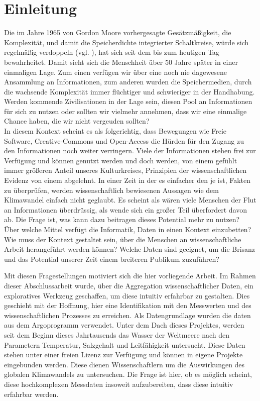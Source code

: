 
\section{Einleitung}

    
    Die im Jahre 1965 von Gordon Moore vorhergesagte Gesätzmäßigkeit, die Komplexität, und damit die Speicherdichte integrierter Schaltkreise, würde sich regelmäßig verdoppeln (vgl. \cite{moore1998cramming}),  hat sich seit dem bis zum heutigen Tag bewahrheitet. Damit sieht sich die Menschheit über 50 Jahre später in einer einmaligen Lage. 
    Zum einen verfügen wir über eine noch nie dagewesene Ansammlung an Informationen, zum anderen wurden die Speichermedien, durch die wachsende Komplexität immer flüchtiger und schwieriger in der Handhabung. Werden kommende Zivilisationen in der Lage sein, diesen Pool an Informationen für sich zu nutzen oder sollten wir vielmehr annehmen, dass wir eine einmalige Chance haben, die wir nicht vergeuden sollten? \\
    
    In diesem Kontext scheint es als folgerichtig, dass Bewegungen wie Freie Software, Creative-Commons und Open-Access die Hürden für den Zugang zu den Informationen noch weiter verringern.  Viele der Informationen stehen frei zur Verfügung und können genutzt werden und doch werden, von einem gefühlt immer größeren Anteil unseres Kulturkreises, Prinzipien der wissenschaftlichen Evidenz von einem abgelehnt. 
    In einer Zeit in der es einfacher den je ist, Fakten zu überprüfen, werden wissenschaftlich bewiesenen Aussagen wie dem Klimawandel einfach nicht geglaubt.
    Es scheint als wären viele Menschen der Flut an Informationen überdrüssig, als wende sich ein großer Teil überfordert davon ab.
    Die Frage ist, was kann dazu beitragen dieses Potential mehr zu nutzen? 
    Über welche Mittel verfügt die Informatik, Daten in einen Kontext einzubetten? Wie muss der Kontext gestaltet sein, über die Menschen an  wissenschaftliche Arbeit herangeführt werden können? Welche Daten sind geeignet, um die Brisanz und das Potential unserer Zeit einem breiteren Publikum zuzuführen? 
    
    Mit diesen Fragestellungen motiviert sich die hier vorliegende Arbeit. Im Rahmen dieser Abschlussarbeit wurde, über die Aggregation wissenschaftlicher Daten, ein exploratives Werkzeug geschaffen, um diese intuitiv erfahrbar zu gestalten. Dies geschieht mit der Hoffnung, hier eine Identifikation mit den Messwerten und des wissenschaftlichen Prozesses zu erreichen. Als Datengrundlage wurden die daten aus dem Argoprogramm verwendet. Unter dem Dach dieses Projektes, werden seit dem Beginn dieses Jahrtausends das Wasser der Weltmeere nach den Parametern Temperatur, Salzgehalt und Leitfähigkeit untersucht. Diese Daten stehen unter einer freien Lizenz zur Verfügung und können in eigene Projekte eingebunden werden.  Diese dienen Wissenschaftlern um die Auswirkungen des globalen Klimawandels zu untersuchen. Die Frage ist hier, ob es möglich scheint, diese hochkomplexen Messdaten insoweit aufzubereiten, dass diese intuitiv erfahrbar werden.
    

